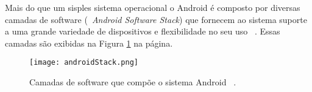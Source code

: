 Mais do que um sisples sistema operacional o Android é composto por diversas camadas de software (~\textit{Android Software Stack}) que fornecem ao sistema suporte a uma grande variedade de dispositivos e flexibilidade no seu uso ~\cite{android}. Essas camadas são exibidas na Figura \ref{fig:androidStack} na página.

\begin{figure}[h]
\centering
\texttt{[image: androidStack.png]}
\caption{Camadas de software que compõe o sistema Android ~\cite{android}.}
\label{fig:androidStack}
\end{figure}


